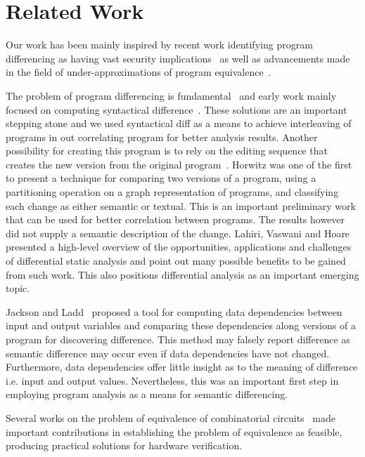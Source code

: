 \section{Related Work}

Our work has been mainly inspired by recent work identifying program differencing as having vast security implications~\cite{BrumleyPoosankamSongZheng08,SongSunZhang09} as well as advancements made in the field of under-approximations of program equivalence~\cite{GodlinStrichman09, KawaguchiLahiriRebelo10, DwyerElbaumPerson08, EnglerRamos11}.

The problem of program differencing is fundamental~\cite{Hoare69} and early work mainly focused on computing syntactical difference~\cite{HuntMcIlroy75}. These solutions are an important stepping stone and we used syntactical diff as a means to achieve interleaving of programs in out correlating program for better analysis results. Another possibility for creating this program is to rely on the editing sequence that creates the new version from the original program~\cite{Horwitz90}. Horwitz was one of the first to present a technique for comparing two versions of a program, using a partitioning operation on a graph representation of programs, and classifying each change as either semantic or textual. This is an important preliminary work that can be used for better correlation between programs. The results however did not supply a semantic description of the change. Lahiri, Vaswani and Hoare \cite{HoareLahiriVaswani10} presented a high-level overview of the opportunities, applications and challenges of differential static analysis and point out many possible benefits to be gained from such work. This also positions differential analysis as an important emerging topic.

Jackson and Ladd~\cite{JacksonLadd94} proposed a tool for computing data dependencies between input and output variables and comparing these dependencies along versions of a program for discovering difference. This method may falsely report difference as semantic difference may occur even if data dependencies have not changed. Furthermore, data dependencies offer little insight as to the meaning of difference i.e. input and output values. Nevertheless, this was an important first step in employing program analysis as a means for semantic differencing.

Several works on the problem of equivalence of combinatorial circuits~\cite{KuehlmannKrohm97,BraytonChatterjeeMishchenkoEen06, ClarkeKroening03} made important contributions in establishing the problem of equivalence as feasible, producing practical solutions for hardware verification.


